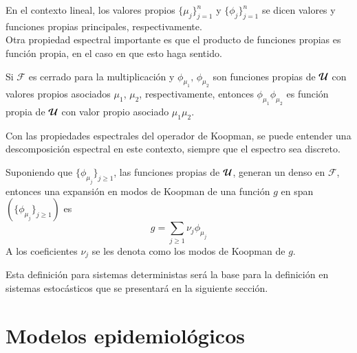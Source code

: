 En el contexto lineal, los valores propios $\{\mu_j\}_{j=1}^n$ y $\{ \phi_j\}_{j=1}^n$ se dicen valores y funciones propias principales, respectivamente. \\
Otra propiedad espectral importante es que el producto de funciones propias es función propia, en el caso en que esto haga sentido.
\begin{prop}
	Si $\mathcal{F}$ es cerrado para la multiplicación y $\phi_{\mu_1}, \, \phi_{\mu_2}$ son funciones propias de $\mathcal{U}$ con valores propios asociados $\mu_1$, $\mu_2$, respectivamente, entonces $\phi_{\mu_1} \phi_{\mu_2}$ es función propia de $\mathcal{U}$ con valor propio asociado $\mu_1 \mu_2$.
\end{prop}
Con las propiedades espectrales del operador de Koopman, se puede entender una descomposición espectral en este contexto, siempre que el espectro sea discreto. 
\begin{defn}
Suponiendo que $\{ \phi_{\mu_j} \}_{j \geq 1}$, las funciones propias de $\mathcal{U}$, generan un denso en $\mathcal{F}$, entonces una expansión en modos de Koopman de una función $g$ en span$(\{ \phi_{\mu_j} \}_{j \geq 1})$ es
	\begin{equation*}
		g = \sum_{j \geq 1} \nu_j \phi_{\mu_j} 
	\end{equation*}
	A los coeficientes $\nu_j$ se les denota como los modos de Koopman de $g$.
\end{defn}
Esta definición para sistemas deterministas será la base para la definición en sistemas estocásticos que se presentará en la siguiente sección.

\section{Modelos epidemiológicos}

